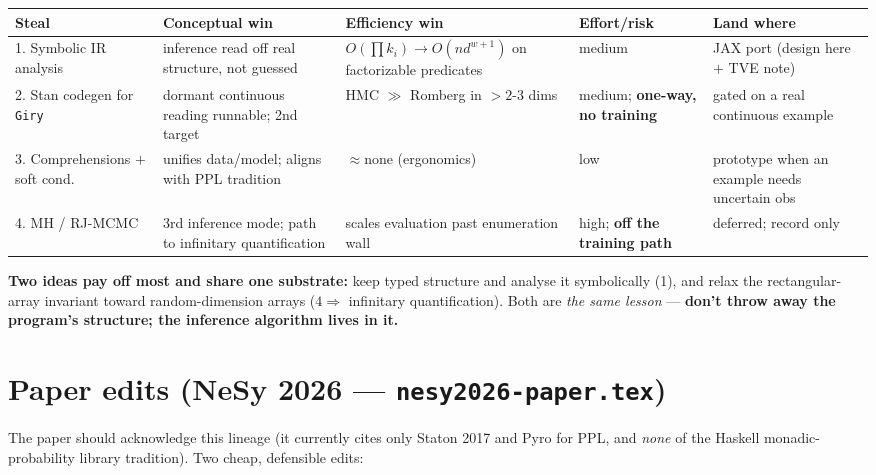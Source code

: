 \documentclass[11pt]{article}
\newcommand{\code}[1]{\texttt{#1}}
\begin{document}
\begin{center}
\begin{tabular}{@{}p{}p{}p{}p{}p{}@{}}
\toprule
Steal & Conceptual win & Efficiency win & Effort/risk & Land where \\
\midrule
1. Symbolic IR analysis & inference read off real structure, not guessed & $O(\prod k_i) \to O(n d^{w+1})$ on factorizable predicates & medium & JAX port (design here $+$ TVE note) \\
2. Stan codegen for \code{Giry} & dormant continuous reading runnable; 2nd target & HMC $\gg$ Romberg in $>2$-$3$ dims & medium; \textbf{one-way, no training} & gated on a real continuous example \\
3. Comprehensions $+$ soft cond. & unifies data/model; aligns with PPL tradition & $\approx$none (ergonomics) & low & prototype when an example needs uncertain obs \\
4. MH / RJ-MCMC & 3rd inference mode; path to infinitary quantification & scales evaluation past enumeration wall & high; \textbf{off the training path} & deferred; record only \\
\bottomrule
\end{tabular}
\end{center}

\noindent\textbf{Two ideas pay off most and share one substrate:} keep typed structure and analyse it
symbolically (1), and relax the rectangular-array invariant toward random-dimension arrays
($4 \Rightarrow$ infinitary quantification). Both are \emph{the same lesson} --- \textbf{don't throw
away the program's structure; the inference algorithm lives in it.}

\section*{Paper edits (NeSy 2026 --- \texttt{nesy2026-paper.tex})}

The paper should acknowledge this lineage (it currently cites only Staton 2017 and Pyro for PPL, and
\emph{none} of the Haskell monadic-probability library tradition). Two cheap, defensible edits:
\end{document}
